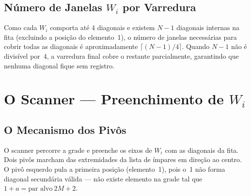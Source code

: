 \documentclass[12pt,a4paper]{article}
\theoremstyle{definition}
\begin{document}
\subsection{Número de Janelas \texorpdfstring{$W_i$}{Wi} por Varredura}
\label{subsec:janela-numero}

Como cada $W_i$ comporta até 4 diagonais e existem $N{-}1$ diagonais
internas na fita (excluindo a posição do elemento~1), o número de janelas
necessárias para cobrir todas as diagonais é aproximadamente
$\lceil(N{-}1)/4\rceil$. Quando $N{-}1$ não é divisível por~4, a varredura
final cobre o restante parcialmente, garantindo que nenhuma diagonal fique
sem registro.

\section{O Scanner — Preenchimento de \texorpdfstring{$W_i$}{Wi}}
\label{sec:scanner}

\subsection{O Mecanismo dos Pivôs}
\label{subsec:scanner-pivos}

O scanner percorre a grade e preenche os eixos de $W_i$ com as diagonais
da fita. Dois pivôs marcham das extremidades da lista de ímpares em direção
ao centro. O pivô esquerdo pula a primeira posição (elemento~1), pois o~1
não forma diagonal secundária válida — não existe elemento na grade tal que
$1 + a = \text{par alvo}\ 2M{+}2$.

\begin{center}
\end{center}
\end{document}
